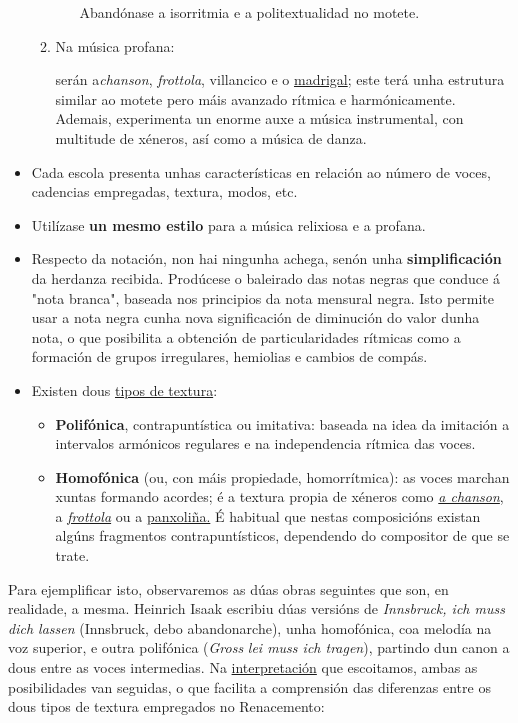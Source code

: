 \documentclass[
]{article}
\begin{document}
\begin{itemize}
\begin{enumerate}
\begin{itemize}
      Abandónase a isorritmia e a politextualidad no motete.
    \end{itemize}
  \item
    Na música profana:

    serán a\emph{chanson}, \emph{frottola}, villancico e o
    \href{http://es.wikipedia.org/wiki/Madrigal_\%28m\%C3\%BAsica\%29}{madrigal};
    este terá unha estrutura similar ao motete pero máis avanzado
    rítmica e harmónicamente. Ademais, experimenta un enorme auxe a
    música instrumental, con multitude de xéneros, así como a música de
    danza.
  \end{enumerate}
\item
  Cada escola presenta unhas características en relación ao número de
  voces, cadencias empregadas, textura, modos, etc.
\item
  Utilízase \textbf{un mesmo estilo} para a música relixiosa e a
  profana.
\item
  Respecto da notación, non hai ningunha achega, senón unha
  \textbf{simplificación} da herdanza recibida. Prodúcese o baleirado
  das notas negras que conduce á "nota branca", baseada nos principios
  da nota mensural negra. Isto permite usar a nota negra cunha nova
  significación de diminución do valor dunha nota, o que posibilita a
  obtención de particularidades rítmicas como a formación de grupos
  irregulares, hemiolias e cambios de compás.
\item
  Existen dous \uline{tipos de textura}:

  \begin{itemize}
  \item
    \textbf{Polifónica}, contrapuntística ou imitativa: baseada na idea
    da imitación a intervalos armónicos regulares e na independencia
    rítmica das voces.
  \item
    \textbf{Homofónica} (ou, con máis propiedade, homorrítmica): as
    voces marchan xuntas formando acordes; é a textura propia de xéneros
    como \href{http://es.wikipedia.org/wiki/Chanson}{\emph{a chanson},}
    a \href{http://es.wikipedia.org/wiki/Frottola}{\emph{frottola}} ou a
    \href{http://es.wikipedia.org/wiki/Villancico}{panxoliña.} É
    habitual que nestas composicións existan algúns fragmentos
    contrapuntísticos, dependendo do compositor de que se trate.
  \end{itemize}
\end{itemize}

Para ejemplificar isto, observaremos as dúas obras seguintes que son, en
realidade, a mesma. Heinrich Isaak escribiu dúas versións de
\emph{Innsbruck, ich muss dich lassen} (Innsbruck, debo abandonarche),
unha homofónica, coa melodía na voz superior, e outra polifónica
(\emph{Gross} \emph{lei muss ich tragen}), partindo dun canon a dous
entre as voces intermedias. Na
\href{http://open.spotify.com/track/6sFWmiPy6R5EeOC58TXO9Y}{interpretación}
que escoitamos, ambas as posibilidades van seguidas, o que facilita a
comprensión das diferenzas entre os dous tipos de textura empregados no
Renacemento:
\end{document}
